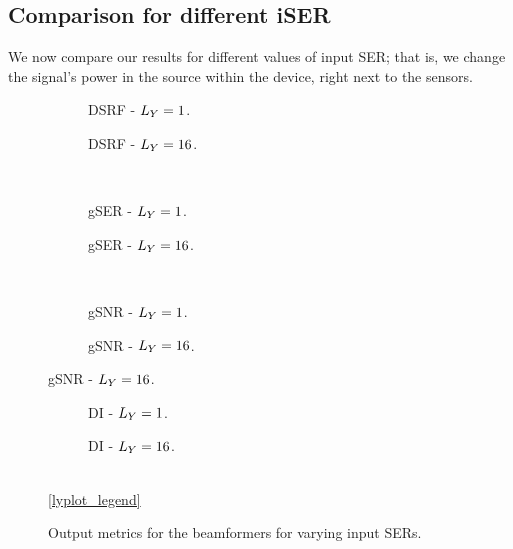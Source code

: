 
\subsection{Comparison for different iSER}

We now compare our results for different values of input SER; that is, we change the signal's power in the source within the device, right next to the sensors.
\begin{figure}[H]
	\centering
	\begin{subfigure}{0.49\textwidth}
		\centering
		
		\caption{DSRF - $\Ly = 1$.}
		\label{subfig:lineplot__DSRF__iSER_var__Ly_1}
	\end{subfigure}\hfill
	\begin{subfigure}{0.49\textwidth}
		\centering
		
		\caption{DSRF - $\Ly = 16$.}
		\label{subfig:lineplot__DSRF__iSER_var__Ly_16}
	\end{subfigure}\\[1em]
	\begin{subfigure}{0.49\textwidth}
		\centering
		
		\caption{gSER - $\Ly = 1$.}
		\label{subfig:lineplot__gSER__iSER_var__Ly_1}
	\end{subfigure}\hfill
	\begin{subfigure}{0.49\textwidth}
		\centering
		
		\caption{gSER - $\Ly = 16$.}
		\label{subfig:lineplot__gSER__iSER_var__Ly_16}
	\end{subfigure}\\[1em]
	\begin{subfigure}{0.49\textwidth}
		\centering
		
		\caption{gSNR - $\Ly = 1$.}
		\label{subfig:lineplot__gSNR__iSER_var__Ly_1}
	\end{subfigure}\hfill
	\begin{subfigure}{0.49\textwidth}
		\centering
		
		\caption{gSNR - $\Ly = 16$.}
		\label{subfig:lineplot__gSNR__iSER_var__Ly_16}
	\end{subfigure}
 \end{figure}
 \begin{figure}\ContinuedFloat
	\begin{subfigure}{0.49\textwidth}
		\centering
		
		\caption{DI - $\Ly = 1$.}
		\label{subfig:lineplot__DI__iSER_var__Ly_1}
	\end{subfigure}\hfill
	\begin{subfigure}{0.49\textwidth}
		\centering
		
		\caption{DI - $\Ly = 16$.}
		\label{subfig:lineplot__DI__iSER_var__Ly_16}
	\end{subfigure}\\[1em]
	\ref*{lyplot_legend}
	\caption{Output metrics for the beamformers for varying input SERs.}
	\label{fig:lineplot__iSER_var__Ly_1}
\end{figure}


